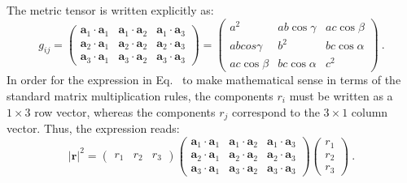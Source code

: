 The metric tensor is written explicitly as:
\[
	g_{ij} = \left(\begin{array}{ccc}
	\mathbf{a}_1\cdot\mathbf{a}_1 & \mathbf{a}_1\cdot\mathbf{a}_2 & \mathbf{a}_1\cdot\mathbf{a}_3 \\
	\mathbf{a}_2\cdot\mathbf{a}_1 & \mathbf{a}_2\cdot\mathbf{a}_2 & \mathbf{a}_2\cdot\mathbf{a}_3 \\
	\mathbf{a}_3\cdot\mathbf{a}_1 & \mathbf{a}_3\cdot\mathbf{a}_2 & \mathbf{a}_3\cdot\mathbf{a}_3 \end{array}\right)
	 = \left(\begin{array}{ccc}
	 a^2 & a b \cos\gamma & a c \cos\beta\\
	 a b cos\gamma & b^2 & b c \cos\alpha\\
	 a c \cos\beta & b c \cos\alpha & c^2 \end{array}\right)\ .
\]
In order for the expression in Eq.~ to make mathematical sense in terms of the standard matrix multiplication rules, the components $r_i$ must be written as a $1\times 3$ row vector, whereas the components $r_j$ correspond to the $3\times 1$ column vector.  Thus, the expression reads:
\[
	\vert\mathbf{r}\vert^2 = \left(\begin{array}{ccc}r_1 & r_2 & r_3\end{array}\right)
	 \left(\begin{array}{ccc}
	\mathbf{a}_1\cdot\mathbf{a}_1 & \mathbf{a}_1\cdot\mathbf{a}_2 & \mathbf{a}_1\cdot\mathbf{a}_3 \\
	\mathbf{a}_2\cdot\mathbf{a}_1 & \mathbf{a}_2\cdot\mathbf{a}_2 & \mathbf{a}_2\cdot\mathbf{a}_3 \\
	\mathbf{a}_3\cdot\mathbf{a}_1 & \mathbf{a}_3\cdot\mathbf{a}_2 & \mathbf{a}_3\cdot\mathbf{a}_3 \end{array}\right) 
	\left(\begin{array}{c}r_1\\
	r_2\\
	r_3\end{array}\right)\ .
\]

